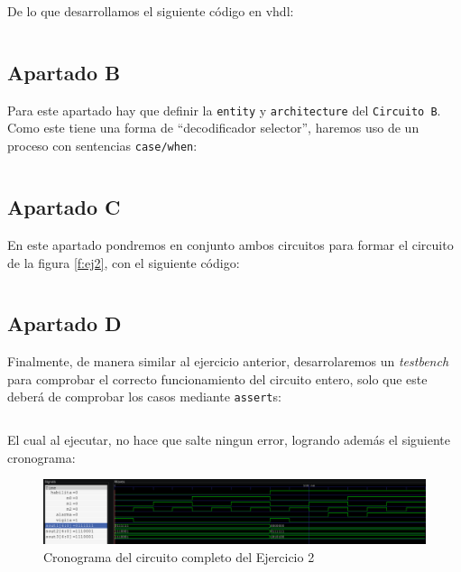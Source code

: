\documentclass[a4paper,titlepage]{article}
\begin{document}
				De lo que desarrollamos el siguiente código en vhdl:
				\inputminted[breaklines]{vhdl}{../Ejercicio2/vhdl/ej2_a.vhd}
			\subsection{Apartado B}
				Para este apartado hay que definir la \texttt{entity} y \texttt{architecture} del \texttt{Circuito B}. 
				Como este tiene una forma de ``decodificador selector'', haremos uso de un proceso con sentencias 
				\texttt{case/when}:\\
				\inputminted[breaklines]{vhdl}{../Ejercicio2/vhdl/ej2_b.vhd}
			\subsection{Apartado C}
				En este apartado pondremos en conjunto ambos circuitos para formar el circuito de la figura \ref{f:ej2},
				con el siguiente código:\\
				\inputminted[breaklines]{vhdl}{../Ejercicio2/vhdl/ej2_c.vhd}
			\subsection{Apartado D}
				Finalmente, de manera similar al ejercicio anterior, desarrolaremos un \textit{testbench} para comprobar
				el correcto funcionamiento del circuito entero, solo que este deberá de comprobar los casos mediante \texttt{assert}s:\\
				\inputminted[breaklines]{vhdl}{../Ejercicio2/vhdl/ej2_d.vhd}
				El cual al ejecutar, no hace que salte ningun error, logrando además el siguiente cronograma:\\
				\begin{figure}[ht]
					\begin{center}
						\includegraphics[width=\textwidth]{../Ejercicio2/wave/gtkwave_ej2.png}
						\caption{Cronograma del circuito completo del Ejercicio 2}
					\end{center}
					\label{f:ej2_crono}
				\end{figure}
\end{document}
